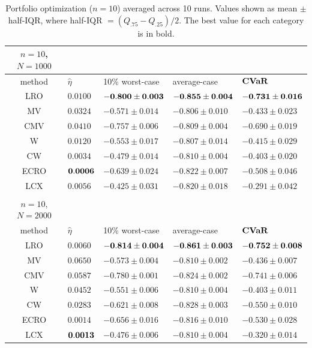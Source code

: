 \documentclass[11pt]{article}
\begin{document}
\begin{table}[ht]
  \centering
  \fontsize{9}{11}\selectfont
{
	\begin{tabular}{cllll}   \toprule   
          $n=10$, $N=1000$ & & & & \\
         \midrule
		method & $\hat{\eta}$ & 10\% worst-case & average-case & $\mathop{\bf CVaR}$ \\
        \midrule
         LRO & $0.0100$ & $\bf{-0.800 \pm 0.003}$ & $\bf{-0.855 \pm 0.004}$ &$\bf{-0.731 \pm 0.016}$\\
        \midrule 
        MV & $0.0324$ & $-0.571 \pm 0.014$ & $-0.806 \pm 0.010$ &$-0.433 \pm 0.023$\\
        \midrule 
        CMV & $0.0410$ & $-0.757 \pm 0.006$ & $-0.809 \pm 0.004$ &$-0.690 \pm 0.019$\\
        \midrule 
        W & $0.0120$ & $-0.553 \pm 0.017$ & $-0.807 \pm 0.014$ &$-0.415 \pm 0.029$\\
        \midrule 
        CW & $0.0034$ & $-0.479 \pm 0.014$ & $-0.810 \pm 0.004$ &$-0.403 \pm 0.020$\\
        \midrule 
        ECRO & $\bf{0.0006}$ & $-0.639 \pm 0.024$ & $-0.822 \pm 0.007$ &$-0.508 \pm 0.046$\\
        \midrule 
        LCX & $0.0056$ & $-0.425 \pm 0.031$ & $-0.820 \pm 0.018$ &$-0.291 \pm 0.042$\\
        \bottomrule \\[-8pt]
                \toprule 
		$n=10$, $N=2000$ & & & & \\
             \midrule
		method & $\hat{\eta}$ & 10\% worst-case & average-case & $\mathop{\bf CVaR}$ \\
 \midrule
         LRO & $0.0060$ & $\bf{-0.814 \pm 0.004}$ & $\bf{-0.861 \pm 0.003}$ &$\bf{-0.752 \pm 0.008}$\\
        \midrule 
        MV & $0.0650$ & $-0.573 \pm 0.004$ & $-0.810 \pm 0.002$ &$-0.436 \pm 0.007$\\
        \midrule 
        CMV & $0.0587$ & $-0.780 \pm 0.001$ & $-0.824 \pm 0.002$ &$-0.741 \pm 0.006$\\
        \midrule 
        W & $0.0452$ & $-0.551 \pm 0.006$ & $-0.810 \pm 0.004$ &$-0.403 \pm 0.011$\\
        \midrule 
        CW & $0.0283$ & $-0.621 \pm 0.008$ & $-0.828 \pm 0.003$ &$-0.550 \pm 0.010$\\
        \midrule 
        ECRO & $0.0014$ & $-0.656 \pm 0.016$ & $-0.816 \pm 0.010$ &$-0.530 \pm 0.028$\\
        \midrule 
        LCX & $\bf{0.0013}$ & $-0.476 \pm 0.006$ & $-0.810 \pm 0.004$ &$-0.320 \pm 0.014$\\
 \bottomrule
		\end{tabular}}
		\caption{Portfolio optimization ($n=10$) averaged across 10 runs. Values shown as mean $\pm$ half-IQR, where half-IQR $= (Q_{.75} - Q_{.25})/2$. The best value for each category is in bold.}
		\label{table:port_n10}
        \vspace{-1em}
\end{table}
\end{document}

